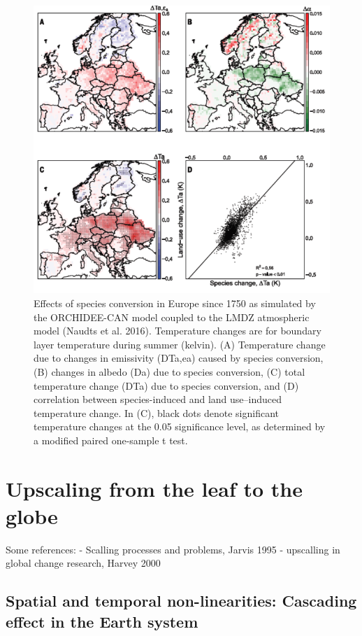 \documentclass[
  12pt,
  oneside]{book}
\begin{document}
\begin{figure}

{\centering \includegraphics[width=0.8\linewidth]{figures/chap8/f817_naudts2} 

}

\caption{Effects of species conversion in Europe since 1750 as simulated by the ORCHIDEE-CAN model coupled to the LMDZ atmospheric model (Naudts et al. 2016). Temperature changes are for boundary layer temperature during summer (kelvin). (A) Temperature change due to changes in emissivity (DTa,ea) caused by species conversion, (B) changes in albedo (Da) due to species conversion, (C) total temperature change (DTa) due to species conversion, and (D) correlation between species-induced and land use–induced temperature change. In (C), black dots denote significant temperature changes at the 0.05 significance level, as determined by a modified paired one-sample t test.}\label{fig:f817}
\end{figure}

\hypertarget{upscaling-from-the-leaf-to-the-globe}{%
\chapter{Upscaling from the leaf to the globe}\label{upscaling-from-the-leaf-to-the-globe}}


Some references:
- Scalling processes and problems, Jarvis 1995
- upscalling in global change research, Harvey 2000

\hypertarget{spatial-and-temporal-non-linearities-cascading-effect-in-the-earth-system}{%
\section{Spatial and temporal non-linearities: Cascading effect in the Earth system}\label{spatial-and-temporal-non-linearities-cascading-effect-in-the-earth-system}}
\end{document}
